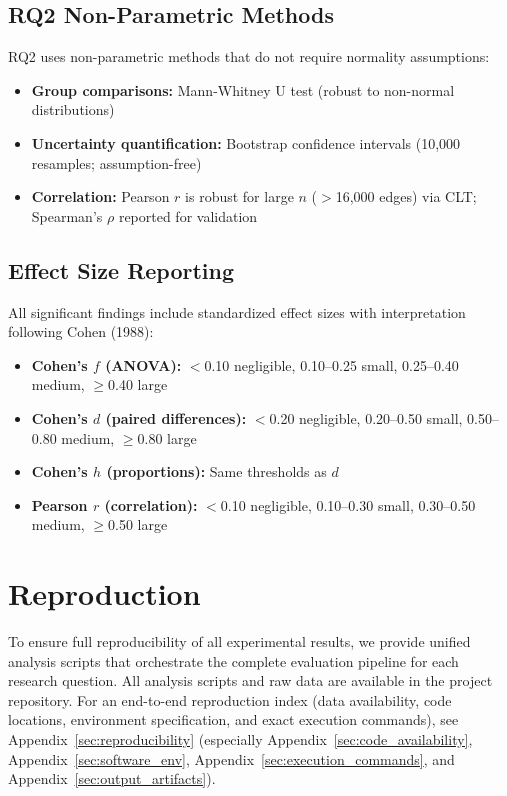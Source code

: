 \subsection{RQ2 Non-Parametric Methods}

RQ2 uses non-parametric methods that do not require normality assumptions:
\begin{itemize}[noitemsep]
    \item \textbf{Group comparisons:} Mann-Whitney U test (robust to non-normal distributions)
    \item \textbf{Uncertainty quantification:} Bootstrap confidence intervals (10,000 resamples; assumption-free)
    \item \textbf{Correlation:} Pearson $r$ is robust for large $n$ ($>$16,000 edges) via CLT; Spearman's $\rho$ reported for validation
\end{itemize}

\subsection{Effect Size Reporting}

All significant findings include standardized effect sizes with interpretation following Cohen (1988):
\begin{itemize}[noitemsep]
    \item \textbf{Cohen's $f$ (ANOVA):} $<$0.10 negligible, 0.10--0.25 small, 0.25--0.40 medium, $\geq$0.40 large
    \item \textbf{Cohen's $d$ (paired differences):} $<$0.20 negligible, 0.20--0.50 small, 0.50--0.80 medium, $\geq$0.80 large
    \item \textbf{Cohen's $h$ (proportions):} Same thresholds as $d$
    \item \textbf{Pearson $r$ (correlation):} $<$0.10 negligible, 0.10--0.30 small, 0.30--0.50 medium, $\geq$0.50 large
\end{itemize}

\section{Reproduction}
\label{sec:reproduction}

To ensure full reproducibility of all experimental results, we provide unified analysis scripts that orchestrate the complete evaluation pipeline for each research question. All analysis scripts and raw data are available in the project repository.
For an end-to-end reproduction index (data availability, code locations, environment specification, and exact execution commands), see Appendix~\ref{sec:reproducibility} (especially Appendix~\ref{sec:code_availability}, Appendix~\ref{sec:software_env}, Appendix~\ref{sec:execution_commands}, and Appendix~\ref{sec:output_artifacts}).

